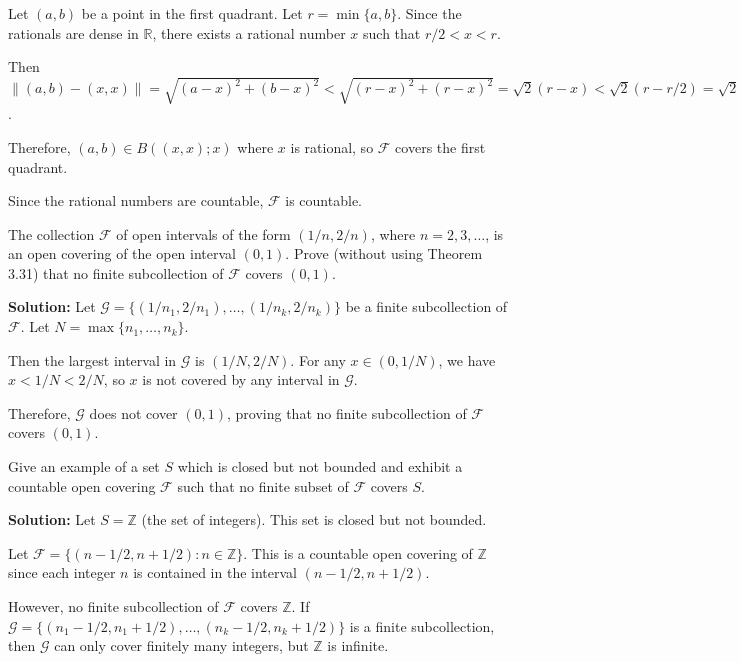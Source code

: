 Let $(a,b)$ be a point in the first quadrant. Let $r = \min\{a,b\}$. Since the rationals are dense in $\mathbb{R}$, there exists a rational number $x$ such that $r/2 < x < r$.

Then $\|(a,b) - (x,x)\| = \sqrt{(a-x)^2 + (b-x)^2} < \sqrt{(r-x)^2 + (r-x)^2} = \sqrt{2}(r-x) < \sqrt{2}(r-r/2) = \sqrt{2}(r/2) < r < x$.

Therefore, $(a,b) \in B((x,x); x)$ where $x$ is rational, so $\mathcal{F}$ covers the first quadrant.

Since the rational numbers are countable, $\mathcal{F}$ is countable.

\begin{problembox}
The collection \( \mathcal{F} \) of open intervals of the form \( (1/n, 2/n) \), where \( n = 2, 3, \ldots \), is an open covering of the open interval \( (0, 1) \). Prove (without using Theorem 3.31) that no finite subcollection of \( \mathcal{F} \) covers \( (0, 1) \).
\end{problembox}

\textbf{Solution:} Let $\mathcal{G} = \{(1/n_1, 2/n_1), \ldots, (1/n_k, 2/n_k)\}$ be a finite subcollection of $\mathcal{F}$. Let $N = \max\{n_1, \ldots, n_k\}$.

Then the largest interval in $\mathcal{G}$ is $(1/N, 2/N)$. For any $x \in (0, 1/N)$, we have $x < 1/N < 2/N$, so $x$ is not covered by any interval in $\mathcal{G}$.

Therefore, $\mathcal{G}$ does not cover $(0,1)$, proving that no finite subcollection of $\mathcal{F}$ covers $(0,1)$.

\begin{problembox}
Give an example of a set \( S \) which is closed but not bounded and exhibit a countable open covering \( \mathcal{F} \) such that no finite subset of \( \mathcal{F} \) covers \( S \).
\end{problembox}

\textbf{Solution:} Let $S = \mathbb{Z}$ (the set of integers). This set is closed but not bounded.

Let $\mathcal{F} = \{(n-1/2, n+1/2) : n \in \mathbb{Z}\}$. This is a countable open covering of $\mathbb{Z}$ since each integer $n$ is contained in the interval $(n-1/2, n+1/2)$.

However, no finite subcollection of $\mathcal{F}$ covers $\mathbb{Z}$. If $\mathcal{G} = \{(n_1-1/2, n_1+1/2), \ldots, (n_k-1/2, n_k+1/2)\}$ is a finite subcollection, then $\mathcal{G}$ can only cover finitely many integers, but $\mathbb{Z}$ is infinite.


